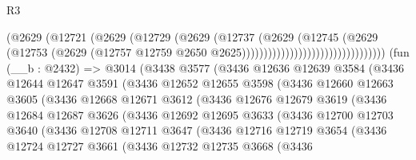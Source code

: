\begin{lexlean}{R3}
\begin{coremodule}
                                              (@2629
                                                (@12721
                                                  (@2629
                                                    (@12729
                                                      (@2629
                                                        (@12737
                                                          (@2629
                                                            (@12745
                                                              (@2629
                                                                (@12753
                                                                  (@2629
                                                                    (@12757
                                                                      @12759
                                                                      @2650
                                                                      @2625)))))))))))))))))))))))))))))))))
    (fun (__b : @2432) =>
    @3014
      (@3438
        @3577
        (@3436
          @12636
          @12639
          @3584
          (@3436
            @12644
            @12647
            @3591
            (@3436
              @12652
              @12655
              @3598
              (@3436
                @12660
                @12663
                @3605
                (@3436
                  @12668
                  @12671
                  @3612
                  (@3436
                    @12676
                    @12679
                    @3619
                    (@3436
                      @12684
                      @12687
                      @3626
                      (@3436
                        @12692
                        @12695
                        @3633
                        (@3436
                          @12700
                          @12703
                          @3640
                          (@3436
                            @12708
                            @12711
                            @3647
                            (@3436
                              @12716
                              @12719
                              @3654
                              (@3436
                                @12724
                                @12727
                                @3661
                                (@3436
                                  @12732
                                  @12735
                                  @3668
                                  (@3436

\end{coremodule}
\end{lexlean}
